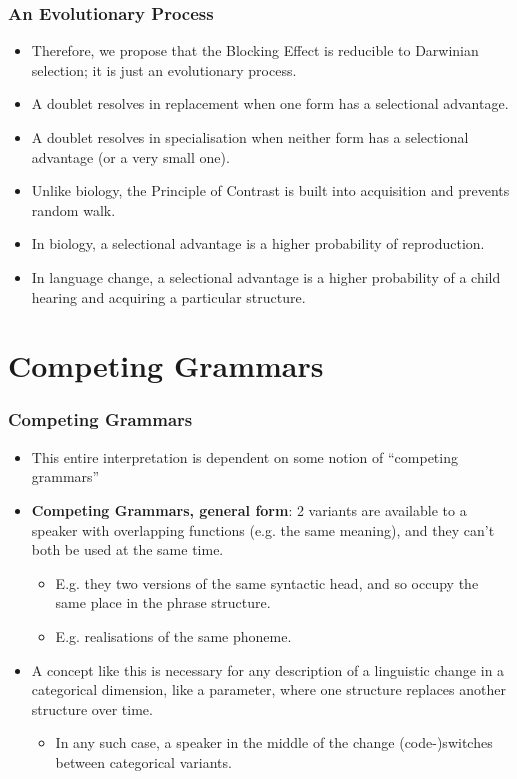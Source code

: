 \documentclass[hyperref={pdfpagelabels=false}]{beamer}
\begin{document}
\begin{frame}
\frametitle{An Evolutionary Process}
\begin{itemize}
	\item Therefore, we propose that the Blocking Effect is reducible to Darwinian selection; it is just an evolutionary process.
	\item A doublet resolves in replacement when one form has a selectional advantage.
	\item A doublet resolves in specialisation when neither form has a selectional advantage (or a very small one).
	\item Unlike biology, the Principle of Contrast is built into acquisition and prevents random walk.
	\item In biology, a selectional advantage is a higher probability of reproduction.
	\item In language change, a selectional advantage is a higher probability of a child hearing and acquiring a particular structure.
\end{itemize}
\end{frame}


\section{Competing Grammars}
\begin{frame}
\frametitle{Competing Grammars}
\begin{itemize}
	\item This entire interpretation is dependent on some notion of ``competing grammars'' \citep{kroch1989, kroch1994}
	\item \textbf{Competing Grammars, general form}: 2 variants are available to a speaker with overlapping functions (e.g. the same meaning), and they can't both be used at the same time.
		\begin{itemize}
			\item E.g. they two versions of the same syntactic head, and so occupy the same place in the phrase structure. 
			\item E.g. realisations of the same phoneme.
		\end{itemize}
	\item A concept like this is necessary for any description of a linguistic change in a categorical dimension, like a parameter, where one structure replaces another structure over time. 
		\begin{itemize} 
			\item In any such case, a speaker in the middle of the change (code-)switches between categorical variants.
		\end{itemize} 
\end{itemize}
\end{frame}
\end{document}
